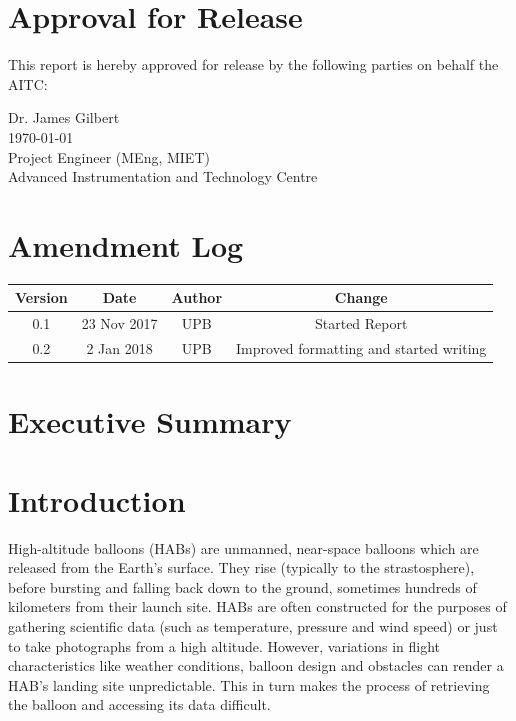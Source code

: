 \documentclass[11pt]{article}
\begin{document}
\newpage

\bigskip
\section{Approval for Release}
This report is hereby approved for release by the following parties on behalf the AITC: \\

\bigskip
\bigskip

\begin{center}
Dr. James Gilbert \\
\today \\
Project Engineer (MEng, MIET) \\
Advanced Instrumentation and Technology Centre
\end{center}


\newpage
\section{Amendment Log}

\begin{table}[!h] \centering
 \begin{tabular}{|c c c c|} 
 \hline
 Version & Date & Author & Change \\ [0.5ex] 
 \hline
 0.1 & 23 Nov 2017 & UPB & Started Report \\
 \hline
  0.2 & 2 Jan 2018 & UPB & Improved formatting and started writing \\
 \hline
\end{tabular}
\end{table}

\newpage

\section{Executive Summary}

\newpage

\tableofcontents

\listoffigures

\listoftables

\newpage

\section{Introduction}

High-altitude balloons (HABs) are unmanned, near-space balloons which are released from the Earth's surface. They rise (typically to the strastosphere), before bursting and falling back down to the ground, sometimes hundreds of kilometers from their launch site. HABs are often constructed for the purposes of gathering scientific data (such as temperature, pressure and wind speed) or just to take photographs from a high altitude. However, variations in flight characteristics like weather conditions, balloon design and obstacles can render a HAB's landing site unpredictable. This in turn makes the process of retrieving the balloon and accessing its data difficult. \\
\end{document}
